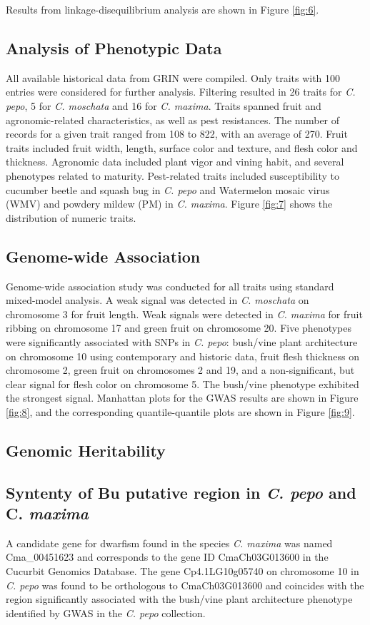 \documentclass[utf8]{FrontiersinHarvard} %
\begin{document}
Results from linkage-disequilibrium analysis are shown in Figure \ref{fig:6}.

\subsection{Analysis of Phenotypic Data}
All available historical data from GRIN were compiled. Only traits with  100 entries were considered for further analysis. Filtering resulted in 26 traits for \textit{C. pepo}, 5 for \textit{C. moschata} and 16 for \textit{C. maxima}. Traits spanned fruit and agronomic-related characteristics, as well as pest resistances. The number of records for a given trait ranged from 108 to 822, with an average of  270. Fruit traits included fruit width, length, surface color and texture, and flesh color and thickness. Agronomic data included plant vigor and vining habit, and several phenotypes related to maturity. Pest-related traits included susceptibility to cucumber beetle and squash bug in \textit{C. pepo} and Watermelon mosaic virus (WMV) and powdery mildew (PM) in \textit{C. maxima}. Figure \ref{fig:7} shows the distribution of numeric traits. 

\subsection{Genome-wide Association}
Genome-wide association study was conducted for all traits using standard mixed-model analysis. A weak signal was detected in \textit{C. moschata} on chromosome 3 for fruit length. Weak signals were detected in \textit{C. maxima} for fruit ribbing on chromosome 17 and green fruit on chromosome 20. Five phenotypes were significantly associated with SNPs in \textit{C. pepo}: bush/vine plant architecture on chromosome 10 using contemporary and historic data, fruit flesh thickness on chromosome 2, green fruit on chromosomes 2 and 19, and a non-significant, but clear signal for flesh color on chromosome 5. The bush/vine phenotype exhibited the strongest signal. Manhattan plots for the GWAS results are shown in Figure \ref{fig:8}, and the corresponding quantile-quantile plots are shown in Figure \ref{fig:9}.

\subsection{Genomic Heritability}

\subsection{Syntenty of Bu putative region in \textit{C. pepo} and C. \textit{maxima}}
A candidate gene for dwarfism found in the species \textit{C. maxima} was named Cma\_00451623 and corresponds to the gene ID CmaCh03G013600 in the Cucurbit Genomics Database. The gene Cp4.1LG10g05740 on chromosome 10 in \textit{C. pepo} was found to be orthologous to CmaCh03G013600 and coincides with the region significantly associated with the bush/vine plant architecture phenotype identified by GWAS in the \textit{C. pepo} collection. 
\end{document}
